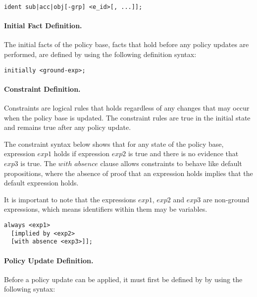 \documentclass[10pt, twocolumn]{article}
\begin{document}
          \begin{verbatim}ident sub|acc|obj[-grp] <e_id>[, ...]];\end{verbatim}

        \paragraph{Initial Fact Definition.}

          The initial facts of the policy base, facts that hold before any
          policy updates are performed, are defined by using the following
          definition syntax:

          \begin{verbatim}initially <ground-exp>;\end{verbatim}

        \paragraph{Constraint Definition.}

          Constraints are logical rules that holds regardless of any changes
          that may occur when the policy base is updated. The constraint rules
          are true in the initial state and remains true after any policy
          update.

          The constraint syntax below shows that for any state of the policy
          base, expression $exp1$ holds if expression $exp2$ is true and there
          is no evidence that $exp3$ is true. The $with$ $absence$ clause
          allows constraints to behave like default propositions, where the
          absence of proof that an expression holds implies that the default
          expression holds.

          It is important to note that the expressions $exp1$, $exp2$ and
          $exp3$ are non-ground expressions, which means identifiers within
          them may be variables.

          \begin{verbatim}
always <exp1>
  [implied by <exp2>
  [with absence <exp3>]];
          \end{verbatim}

        \paragraph{Policy Update Definition.}

          Before a policy update can be applied, it must first be defined by
          by using the following syntax:
\end{document}
